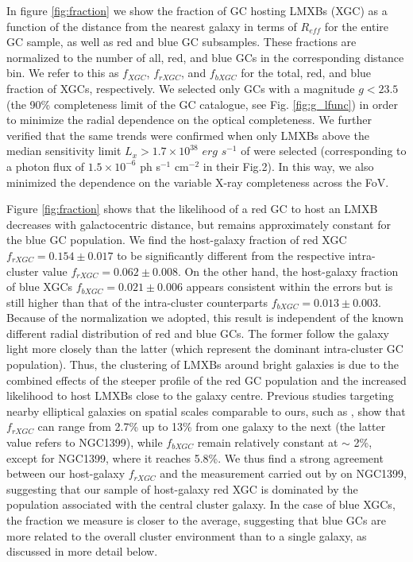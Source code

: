 \documentclass{aa}
\begin{document}
   
In figure \ref{fig:fraction} we show the fraction of GC hosting LMXBs (XGC) as a function of the distance from the nearest galaxy in terms of $R_{eff}$ for the entire GC sample, as well as red and blue GC subsamples. These fractions are normalized to the number of all, red, and blue GCs  in the corresponding distance bin. We refer to this as  $f_{XGC}$, $f_{rXGC}$, and $f_{bXGC}$  for the total, red, and blue fraction of XGCs, respectively. We selected only GCs with a magnitude $g<23.5$ (the 90\% completeness limit of the GC catalogue, see Fig. \ref{fig:g_lfunc}) in order to minimize the radial dependence on the optical completeness. We further verified that the same trends were confirmed when only LMXBs above the median sensitivity limit $L_x>1.7\times 10^{38}$ $erg$ $s^{-1}$ of \citet{Jin2019} were selected (corresponding to a photon flux of $1.5\times 10^{-6}$ ph s$^{-1}$ cm$^{-2}$ in their Fig.2). In this way, we also minimized the dependence on the variable X-ray completeness across the FoV. 

Figure \ref{fig:fraction} shows that the likelihood of a red GC to host an LMXB decreases with galactocentric distance, but remains approximately constant for the blue GC population. We find the host-galaxy fraction of red XGC $f_{rXGC}=0.154\pm0.017$ to be significantly different from the respective intra-cluster value $f_{rXGC}=0.062\pm0.008$. On the other hand, the host-galaxy fraction of blue XGCs $f_{bXGC}=0.021\pm0.006$ appears consistent within the errors but is still higher than that of the intra-cluster counterparts $f_{bXGC}=0.013\pm0.003$. Because of the normalization we adopted, this result is independent of the known different radial distribution of red and blue GCs. The former follow the galaxy light more closely than the latter (which represent the dominant intra-cluster GC population). Thus, the clustering of LMXBs around bright galaxies is  due to the combined effects of the steeper profile of the red GC population and the increased likelihood to host LMXBs close to the galaxy centre. Previous studies targeting nearby elliptical galaxies on spatial scales comparable to ours, such as \citet{Kim2006}, show that $f_{rXGC}$ can range from 2.7\% up to 13\% from one galaxy to the next (the latter value refers to NGC1399), while $f_{bXGC}$ remain relatively constant at $\sim$ 2\%, except for NGC1399, where it reaches 5.8\%.  We thus find a strong agreement between our host-galaxy $f_{rXGC}$ and the measurement carried out by \cite{Kim2006} on NGC1399, suggesting that our sample of host-galaxy red XGC is dominated by the population associated with the central cluster galaxy. In the case of blue XGCs, the fraction we measure is closer to the average, suggesting that blue GCs are more related to the overall cluster environment than to a single galaxy, as discussed in more detail below.
\end{document}
